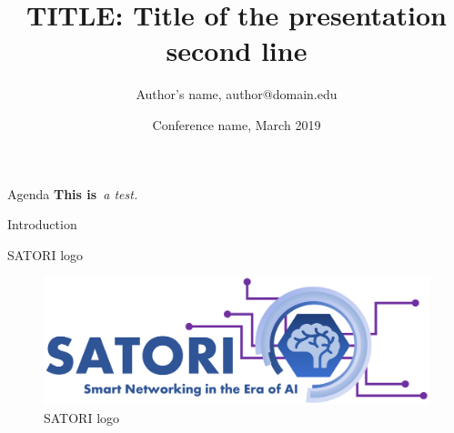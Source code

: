 \documentclass[aspectratio=169,t]{beamer}
\title{TITLE: Title of the presentation\\second line}
\author{Author's name, author@domain.edu}
\institute{University of affiliation}
\date{Conference name, March 2019}
\begin{document}
{
    \maketitle
}
\addtocounter{framenumber}{-1}


\begin{frame}{Agenda}
    \textbf{This is}\emph{~a test.}
    \blindenumerate[5]
\end{frame}

\begin{frame}{Introduction}
    \blindenumerate[5]
\end{frame}

\begin{frame}{SATORI logo}
    \begin{figure}
        \centering
        \includegraphics[width=0.7\linewidth]{logos/satori-big-logo.pdf}
        \caption{SATORI logo}
        \label{fig:satori-logo}
    \end{figure}
\end{frame}

\end{document}
